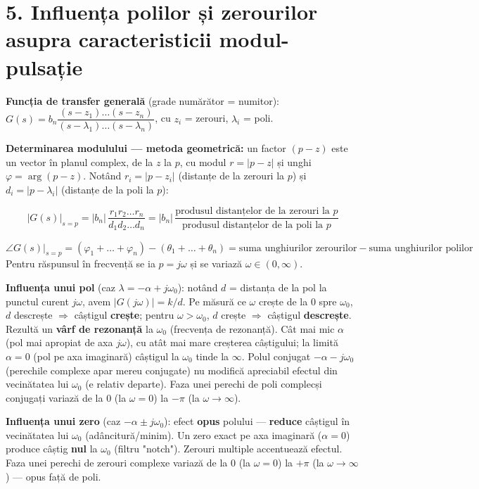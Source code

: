 \documentclass[10pt,a4paper]{article}
\begin{document}
\section*{5. Influența polilor și zerourilor asupra caracteristicii modul-pulsație}
\textbf{Funcția de transfer generală} (grade numărător = numitor): $G(s)=b_n\dfrac{(s-z_1)\dots(s-z_n)}{(s-\lambda_1)\dots(s-\lambda_n)}$, cu $z_i$ = zerouri, $\lambda_i$ = poli.

\textbf{Determinarea modulului — metoda geometrică:} un factor $(p-z)$ este un vector în planul complex, de la $z$ la $p$, cu modul $r=|p-z|$ și unghi $\varphi=\arg(p-z)$. Notând $r_i=|p-z_i|$ (distanțe de la zerouri la $p$) și $d_i=|p-\lambda_i|$ (distanțe de la poli la $p$):
\begin{keyeq}\color{red!65!black}
$$|G(s)|_{s=p}=|b_n|\,\dfrac{r_1r_2\dots r_n}{d_1d_2\dots d_n}=|b_n|\,\dfrac{\text{produsul distanțelor de la zerouri la }p}{\text{produsul distanțelor de la poli la }p}$$
\end{keyeq}
$$\angle G(s)|_{s=p}=(\varphi_1+\dots+\varphi_n)-(\theta_1+\dots+\theta_n)=\text{suma unghiurilor zerourilor}-\text{suma unghiurilor polilor}$$
Pentru răspunsul în frecvență se ia $p=j\omega$ și se variază $\omega\in(0,\infty)$.

\textbf{Influența unui pol} (caz $\lambda=-\alpha+j\omega_0$): notând $d$ = distanța de la pol la punctul curent $j\omega$, avem $|G(j\omega)|=k/d$. Pe măsură ce $\omega$ crește de la $0$ spre $\omega_0$, $d$ descrește $\Rightarrow$ câștigul \textbf{crește}; pentru $\omega>\omega_0$, $d$ crește $\Rightarrow$ câștigul \textbf{descrește}. Rezultă un \textbf{vârf de rezonanță} la $\omega_0$ (frecvența de rezonanță). Cât mai mic $\alpha$ (pol mai apropiat de axa $j\omega$), cu atât mai mare creșterea câștigului; la limită $\alpha=0$ (pol pe axa imaginară) câștigul la $\omega_0$ tinde la $\infty$. Polul conjugat $-\alpha-j\omega_0$ (perechile complexe apar mereu conjugate) nu modifică apreciabil efectul din vecinătatea lui $\omega_0$ (e relativ departe). Faza unei perechi de poli complecși conjugați variază de la $0$ (la $\omega=0$) la $-\pi$ (la $\omega\to\infty$).

\textbf{Influența unui zero} (caz $-\alpha\pm j\omega_0$): efect \textbf{opus} polului — \textbf{reduce} câștigul în vecinătatea lui $\omega_0$ (adâncitură/minim). Un zero exact pe axa imaginară ($\alpha=0$) produce câștig \textbf{nul} la $\omega_0$ (filtru "notch"). Zerouri multiple accentuează efectul. Faza unei perechi de zerouri complexe variază de la $0$ (la $\omega=0$) la $+\pi$ (la $\omega\to\infty$) — opus față de poli.
\end{document}
